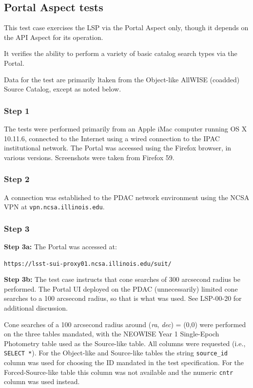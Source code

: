 
\subsection{Portal Aspect tests}

This test case exercises the LSP via the Portal Aspect only,
though it depends on the API Aspect for its operation.

It verifies the ability to perform a variety of basic catalog search types via the Portal.

Data for the test are primarily ltaken from the Object-like AllWISE (coadded) Source Catalog,
except as noted below.

\subsubsection{Step 1}

The tests were performed primarily from an Apple iMac computer running OS X 10.11.6,
connected to the Internet using a wired connection to the IPAC institutional network.
The Portal was accessed using the Firefox browser, in various versions.
Screenshots were taken from Firefox 59.

\subsubsection{Step 2}

A connection was established to the PDAC network environment using the NCSA VPN at \texttt{vpn.ncsa.illinois.edu}.

\subsubsection{Step 3}

\textbf{Step 3a:} The Portal was accessed at:

\begin{center}
\texttt{https://lsst-sui-proxy01.ncsa.illinois.edu/suit/}
\end{center}

\textbf{Step 3b:} The test case instructs that cone searches of 300 arcsecond radius be performed.
The Portal UI deployed on the PDAC (unnecessarily) limited cone searches to a 100 arcsecond radius,
so that is what was used.
See LSP-00-20 for additional discussion.

Cone searches of a 100 arcsecond radius around (\emph{ra}, \emph{dec}) = (0,0) were performed on the three tables mandated, with the NEOWISE Year 1 Single-Epoch Photometry table used as the Source-like table.
All columns were requested (i.e., \texttt{SELECT *}).
For the Object-like and Source-like tables the string \verb|source_id| column was used for choosing the ID mandated in the test specification.
For the Forced-Source-like table this column was not available and the numeric \verb|cntr| column was used instead.

